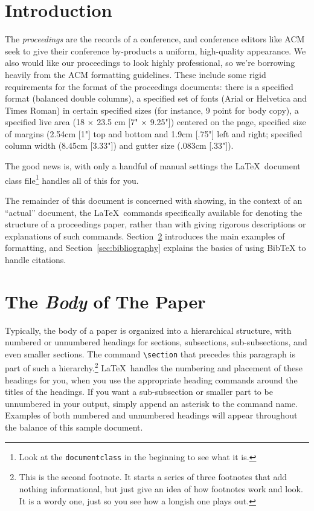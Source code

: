 \documentclass[sigplan,screen,nonacm]{acmart}
\begin{document}
\section{Introduction}
\label{sec:introduction}

The \textit{proceedings} are the records of a conference, and conference
editors like ACM seek to give their conference by-products a uniform,
high-quality appearance. We also would like our proceedings to look highly
professional, so we're borrowing heavily from the ACM formatting guidelines.
These include some
rigid requirements for the format of the proceedings documents: there
is a specified format (balanced  double columns), a specified
set of fonts (Arial or Helvetica and Times Roman) in
certain specified sizes (for instance, 9 point for body copy),
a specified live area (18 $\times$ 23.5 cm [7" $\times$ 9.25"]) centered on
the page, specified size of margins (2.54cm [1"] top and
bottom and 1.9cm [.75"] left and right; specified column width
(8.45cm [3.33"]) and gutter size (.083cm [.33"]).


The good news is, with only a handful of manual
settings the \LaTeX\ document
class file\footnote{Look at the \texttt{documentclass} in the beginning to see what it is.} handles all of this for you.

The remainder of this document is concerned with showing, in
the context of an ``actual'' document, the \LaTeX\ commands
specifically available for denoting the structure of a
proceedings paper, rather than with giving rigorous descriptions
or explanations of such commands. Section~\ref{sec:body} introduces the main
examples of formatting, and Section~\ref{sec:bibliography} explains the basics of using BibTeX to handle citations. 

\section{The {\it Body} of The Paper}
\label{sec:body}

Typically, the body of a paper is organized
into a hierarchical structure, with numbered or unnumbered
headings for sections, subsections, sub-subsections, and even
smaller sections.  The command \texttt{\textbackslash section} that
precedes this paragraph is part of such a
hierarchy.\footnote{This is the second footnote.  It
starts a series of three footnotes that add nothing
informational, but just give an idea of how footnotes work
and look. It is a wordy one, just so you see
how a longish one plays out.} \LaTeX\ handles the numbering
and placement of these headings for you, when you use
the appropriate heading commands around the titles
of the headings.  If you want a sub-subsection or
smaller part to be unnumbered in your output, simply append an
asterisk to the command name.  Examples of both
numbered and unnumbered headings will appear throughout the
balance of this sample document.
\end{document}

